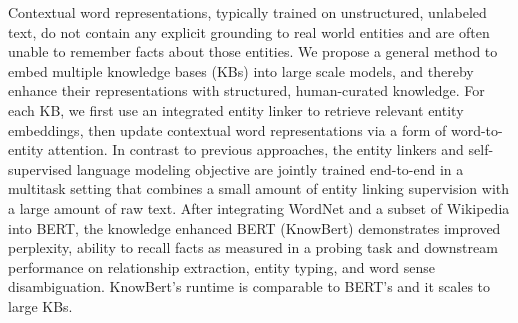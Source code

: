 Contextual word representations, typically trained on unstructured, unlabeled text, do not contain any explicit grounding to real world entities and are often unable to remember facts about those entities. We propose a general method to embed multiple knowledge bases (KBs) into large scale models, and thereby enhance their representations with structured, human-curated knowledge. For each KB, we first use an integrated entity linker to retrieve relevant entity embeddings, then update contextual word representations via a form of word-to-entity attention. In contrast to previous approaches, the entity linkers and self-supervised language modeling objective are jointly trained end-to-end in a multitask setting that combines a small amount of entity linking supervision with a large amount of raw text.
After integrating WordNet and a subset of Wikipedia into BERT, the knowledge enhanced BERT (KnowBert) demonstrates improved perplexity, ability to recall facts as measured in a probing task and downstream performance on relationship extraction, entity typing, and word sense disambiguation. KnowBert's runtime is comparable to BERT's and it scales to large KBs.